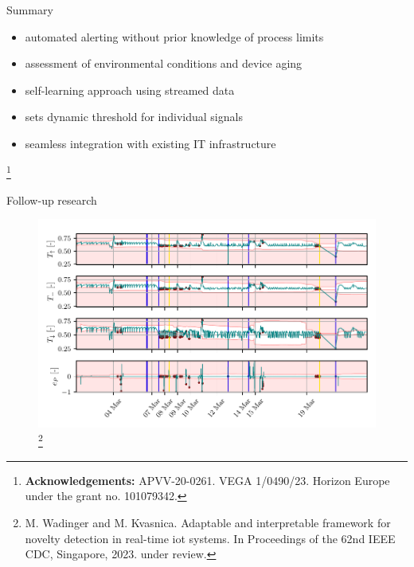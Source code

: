 \documentclass[aspectratio=169]{beamer}
\begin{document}
\newcommand\blfootnote[1]{%
    \begingroup
    \renewcommand\thefootnote{}\footnote{#1}%
    \addtocounter{footnote}{-1}%
    \endgroup
    }

\begin{frame}{Summary}
    \begin{itemize}
        \item automated alerting without prior knowledge of process limits
        \item assessment of environmental conditions and device aging
        \item self-learning approach using streamed data
        \item sets dynamic threshold for individual signals
        \item seamless integration with existing IT infrastructure
    \end{itemize}
    
    \blfootnote{\tiny \textbf{Acknowledgements:} APVV-20-0261. VEGA 1/0490/23. Horizon Europe under the grant no. 101079342.}
\end{frame}

\begin{frame}{Follow-up research}
    \begin{figure}[htpb]
        \begin{center}
            \includegraphics[width=0.65\linewidth]{../PC2023 Presentation/figures/cdc.pdf}
            \footnote{\tiny M. Wadinger and M. Kvasnica. Adaptable and interpretable framework for novelty detection in real-time iot systems. In Proceedings of the 62nd IEEE CDC, Singapore, 2023. under review.}
        \end{center}
    \end{figure}
\end{frame}
\end{document}
